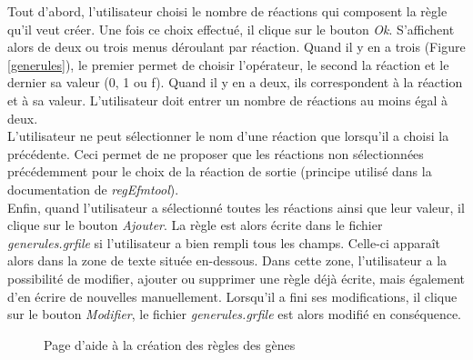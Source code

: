 Tout d'abord, l'utilisateur choisi le nombre de réactions qui composent la règle qu'il veut créer.
Une fois ce choix effectué, il clique sur le bouton \emph{Ok}. S'affichent alors de deux ou trois menus déroulant par réaction. Quand il y en a trois (Figure \ref{generules}), le premier permet de choisir l'opérateur, le second la réaction et le dernier sa valeur (0, 1 ou f). Quand il y en a deux, ils correspondent à la réaction et à sa valeur. L'utilisateur doit entrer un nombre de réactions au moins égal à deux.\\

L'utilisateur ne peut sélectionner le nom d'une réaction que lorsqu'il a choisi la précédente. Ceci permet de ne proposer que les réactions non sélectionnées précédemment pour le choix de la  réaction de sortie (principe utilisé dans la documentation de \emph{regEfmtool}).\\

Enfin, quand l'utilisateur a sélectionné toutes les réactions ainsi que leur valeur, il clique sur le bouton \emph{Ajouter}. La règle est alors écrite dans le fichier \emph{generules.grfile} si l'utilisateur a bien rempli tous les champs. Celle-ci apparaît alors dans la zone de texte située en-dessous. Dans cette zone, l'utilisateur a la possibilité de modifier, ajouter ou supprimer une règle déjà écrite, mais également d'en écrire de nouvelles manuellement. Lorsqu'il a fini ses modifications, il clique sur le bouton \emph{Modifier}, le fichier \emph{generules.grfile} est alors modifié en conséquence.\\

\begin{figure}[!ht]
	\begin{center}
		\caption{Page d'aide à la création des règles des gènes}
  		\label{helpGenerules}
  	\end{center}	
\end{figure}

